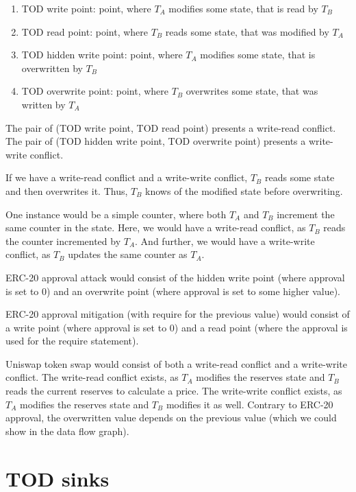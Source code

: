 \documentclass[draft,final]{vutinfth} %
\begin{document}

\begin{enumerate}
    \item TOD write point: point, where $T_A$ modifies some state, that is read by $T_B$
    \item TOD read point: point, where $T_B$ reads some state, that was modified by $T_A$
    \item TOD hidden write point: point, where $T_A$ modifies some state, that is overwritten by $T_B$
    \item TOD overwrite point: point, where $T_B$ overwrites some state, that was written by $T_A$
\end{enumerate}

The pair of (TOD write point, TOD read point) presents a write-read conflict. The pair of (TOD hidden write point, TOD overwrite point) presents a write-write conflict.

If we have a write-read conflict and a write-write conflict, $T_B$ reads some state and then overwrites it. Thus, $T_B$ knows of the modified state before overwriting.

One instance would be a simple counter, where both $T_A$ and $T_B$ increment the same counter in the state. Here, we would have a write-read conflict, as $T_B$ reads the counter incremented by $T_A$. And further, we would have a write-write conflict, as $T_B$ updates the same counter as $T_A$.

ERC-20 approval attack would consist of the hidden write point (where approval is set to 0) and an overwrite point (where approval is set to some higher value).

ERC-20 approval mitigation (with require for the previous value) would consist of a write point (where approval is set to 0) and a read point (where the approval is used for the require statement).

Uniswap token swap would consist of both a write-read conflict and a write-write conflict. The write-read conflict exists, as $T_A$ modifies the reserves state and $T_B$ reads the current reserves to calculate a price. The write-write conflict exists, as $T_A$ modifies the reserves state and $T_B$ modifies it as well. Contrary to ERC-20 approval, the overwritten value depends on the previous value (which we could show in the data flow graph).

\section{TOD sinks}
\end{document}
